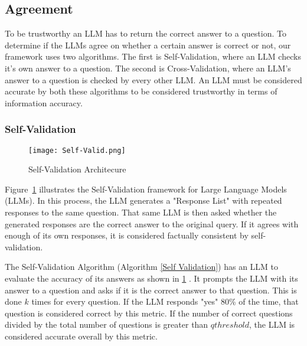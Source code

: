 \subsection{Agreement}
To be trustworthy an LLM has to return the correct answer to a question. To determine if the LLMs agree on whether a certain answer is correct or not, our framework uses two algorithms. The first is Self-Validation, where an LLM checks it's own answer to a question. The second is Cross-Validation, where an LLM's answer to a question is checked by every other LLM. An LLM must be considered accurate by both these algorithms to be considered trustworthy in terms of information accuracy.

\subsubsection{Self-Validation}

\begin{figure}[t]
    \centering
    \texttt{[image: Self-Valid.png]}
    \caption{Self-Validation Architecure}
    \label{fig:Self-Valid-Alg-Fig}
\end{figure}

Figure~\ref{fig:Self-Valid-Alg-Fig} illustrates the Self-Validation framework for Large Language Models (LLMs). In this process, the LLM generates a "Response List" with repeated responses to the same question. That same LLM is then asked whether the generated responses are the correct answer to the original query. If it agrees with enough of its own responses, it is considered factually consistent by self-validation.

The Self-Validation Algorithm (Algorithm \ref{Self Validation}) has an LLM to evaluate the accuracy of its answers as shown in \ref{fig:Self-Valid-Alg-Fig} . It prompts the LLM with its answer to a question and asks if it is the correct answer to that question. This is done $k$ times for every question. If the LLM responds "yes" 80\% of the time, that question is considered correct by this metric. If the number of correct questions divided by the total number of questions is greater than $qthreshold$, the LLM is considered accurate overall by this metric.


